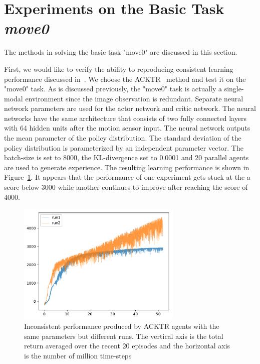 
\section{Experiments on the Basic Task \textit{move0}}\label{sec_exp_move0}

The methods in solving the basic task "move0" are discussed in this section.

First, we would like to verify the ability to reproducing consistent learning performance discussed in~\cite{henderson2017matters}. We choose the ACKTR~\cite{wu2017scalable} method and test it on the "move0" task. As is discussed previously, the "move0" task is actually a single-modal environment since the image observation is redundant. Separate neural network parameters are used for the actor network and critic network. The neural networks have the same architecture that consists of two fully connected layers with 64 hidden units after the motion sensor input. The neural network outputs the mean parameter of the policy distribution. The standard deviation of the policy distribution is parameterized by an independent parameter vector. The batch-size is set to 8000, the KL-divergence set to 0.0001 and 20 parallel agents are used to generate experience. The resulting learning performance is shown in Figure~\ref{fig_acktr_reprod}. It appears that the performance of one experiment gets stuck at the a score below 3000 while another continues to improve after reaching the score of 4000. 
\begin{figure}[!htbp]
	\includegraphics[width=0.7\textwidth]{images/rec_acktr_reprod}
	\centering
	\caption{Inconsistent performance produced by ACKTR agents with the same  parameters but different runs. The vertical axis is the total return averaged over the recent 20 episodes and the horizontal axis is the number of million time-steps}\label{fig_acktr_reprod}
\end{figure}

